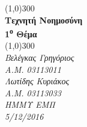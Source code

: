 \documentclass[12pt, a4 paper]{article}
\begin{document}
\begin{titlepage}
	\begin{center}
	 
	\line(1,0){300}\\
	[0.25in]
	\huge{\bfseries{Τεχνητή Νοημοσύνη\\
	1\textsuperscript{ο} Θέμα}}\\
	[2mm]
	\line(1,0){300}\\
	[1cm]
	\textit{Βελέγκας Γρηγόριος}\\
	\textit{Α.Μ. 03113011}\\
	[5mm]
	\textit{Λωτίδης Κυριάκος}\\
	\textit{Α.Μ. 03113033}\\
	[10mm]
	\textit{ΗΜΜΥ ΕΜΠ}\\
	\textit{5/12/2016}\\
	\end{center}
	
\end{titlepage}

\newpage
\end{document}
